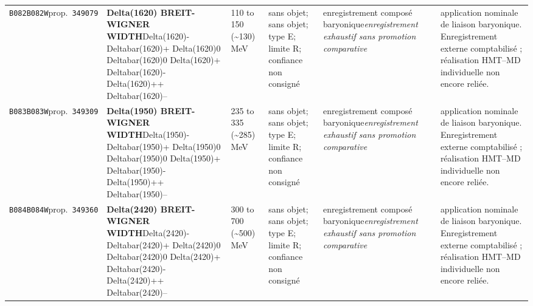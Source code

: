 \begin{landscape}
\begin{longtable}{L{1.85cm}L{4.45cm}L{2.35cm}L{4.05cm}L{3.35cm}L{7.15cm}}
\texttt{B082}\newline \texttt{B082W}\newline prop.\ \texttt{349079} & \textbf{Delta(1620) BREIT-WIGNER WIDTH}\newline Delta(1620)- \textbar{}\allowbreak{} Deltabar(1620)+ \textbar{}\allowbreak{} Delta(1620)0 \textbar{}\allowbreak{} Deltabar(1620)0 \textbar{}\allowbreak{} Delta(1620)+ \textbar{}\allowbreak{} Deltabar(1620)- \textbar{}\allowbreak{} Delta(1620)++ \textbar{}\allowbreak{} Deltabar(1620)-- & 110 to 150 (\textasciitilde{}130)\,MeV & sans objet; sans objet; type E; limite R; confiance non consigné & enregistrement composé baryonique\newline \emph{enregistrement exhaustif sans promotion comparative} & application nominale de liaison baryonique. Enregistrement externe comptabilisé ; réalisation HMT--MD individuelle non encore reliée. \\
\texttt{B083}\newline \texttt{B083W}\newline prop.\ \texttt{349309} & \textbf{Delta(1950) BREIT-WIGNER WIDTH}\newline Delta(1950)- \textbar{}\allowbreak{} Deltabar(1950)+ \textbar{}\allowbreak{} Delta(1950)0 \textbar{}\allowbreak{} Deltabar(1950)0 \textbar{}\allowbreak{} Delta(1950)+ \textbar{}\allowbreak{} Deltabar(1950)- \textbar{}\allowbreak{} Delta(1950)++ \textbar{}\allowbreak{} Deltabar(1950)-- & 235 to 335 (\textasciitilde{}285)\,MeV & sans objet; sans objet; type E; limite R; confiance non consigné & enregistrement composé baryonique\newline \emph{enregistrement exhaustif sans promotion comparative} & application nominale de liaison baryonique. Enregistrement externe comptabilisé ; réalisation HMT--MD individuelle non encore reliée. \\
\texttt{B084}\newline \texttt{B084W}\newline prop.\ \texttt{349360} & \textbf{Delta(2420) BREIT-WIGNER WIDTH}\newline Delta(2420)- \textbar{}\allowbreak{} Deltabar(2420)+ \textbar{}\allowbreak{} Delta(2420)0 \textbar{}\allowbreak{} Deltabar(2420)0 \textbar{}\allowbreak{} Delta(2420)+ \textbar{}\allowbreak{} Deltabar(2420)- \textbar{}\allowbreak{} Delta(2420)++ \textbar{}\allowbreak{} Deltabar(2420)-- & 300 to 700 (\textasciitilde{}500)\,MeV & sans objet; sans objet; type E; limite R; confiance non consigné & enregistrement composé baryonique\newline \emph{enregistrement exhaustif sans promotion comparative} & application nominale de liaison baryonique. Enregistrement externe comptabilisé ; réalisation HMT--MD individuelle non encore reliée. \\

\end{longtable}
\end{landscape}
